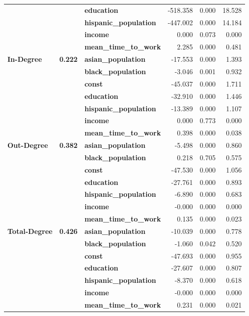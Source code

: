 \begin{tabular}{lllrrr}
             &       & \textbf{education} & -518.358 &    0.000 &   18.528 \\
             &       & \textbf{hispanic\_population} & -447.002 &    0.000 &   14.184 \\
             &       & \textbf{income} &    0.000 &    0.073 &    0.000 \\
             &       & \textbf{mean\_time\_to\_work} &    2.285 &    0.000 &    0.481 \\
\cline{1-6}
\cline{2-6}
\multirow{7}{*}{\textbf{In-Degree}} & \multirow{7}{*}{\textbf{0.222}} & \textbf{asian\_population} &  -17.553 &    0.000 &    1.393 \\
             &       & \textbf{black\_population} &   -3.046 &    0.001 &    0.932 \\
             &       & \textbf{const} &  -45.037 &    0.000 &    1.711 \\
             &       & \textbf{education} &  -32.910 &    0.000 &    1.446 \\
             &       & \textbf{hispanic\_population} &  -13.389 &    0.000 &    1.107 \\
             &       & \textbf{income} &    0.000 &    0.773 &    0.000 \\
             &       & \textbf{mean\_time\_to\_work} &    0.398 &    0.000 &    0.038 \\
\cline{1-6}
\cline{2-6}
\multirow{7}{*}{\textbf{Out-Degree}} & \multirow{7}{*}{\textbf{0.382}} & \textbf{asian\_population} &   -5.498 &    0.000 &    0.860 \\
             &       & \textbf{black\_population} &    0.218 &    0.705 &    0.575 \\
             &       & \textbf{const} &  -47.530 &    0.000 &    1.056 \\
             &       & \textbf{education} &  -27.761 &    0.000 &    0.893 \\
             &       & \textbf{hispanic\_population} &   -6.890 &    0.000 &    0.683 \\
             &       & \textbf{income} &   -0.000 &    0.000 &    0.000 \\
             &       & \textbf{mean\_time\_to\_work} &    0.135 &    0.000 &    0.023 \\
\cline{1-6}
\cline{2-6}
\multirow{7}{*}{\textbf{Total-Degree}} & \multirow{7}{*}{\textbf{0.426}} & \textbf{asian\_population} &  -10.039 &    0.000 &    0.778 \\
             &       & \textbf{black\_population} &   -1.060 &    0.042 &    0.520 \\
             &       & \textbf{const} &  -47.693 &    0.000 &    0.955 \\
             &       & \textbf{education} &  -27.607 &    0.000 &    0.807 \\
             &       & \textbf{hispanic\_population} &   -8.370 &    0.000 &    0.618 \\
             &       & \textbf{income} &   -0.000 &    0.000 &    0.000 \\
             &       & \textbf{mean\_time\_to\_work} &    0.231 &    0.000 &    0.021 \\
\bottomrule
\end{tabular}
